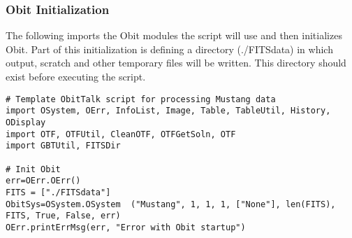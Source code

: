 \documentclass[11pt]{report}
\begin{document}
\subsubsection{Obit Initialization}
The following imports the Obit modules the script will use and then
initializes Obit.
Part of this initialization is defining a directory (./FITSdata) in
which output, scratch and other temporary files will be written.
This directory should exist before executing the script.
\begin{verbatim}
# Template ObitTalk script for processing Mustang data
import OSystem, OErr, InfoList, Image, Table, TableUtil, History, ODisplay
import OTF, OTFUtil, CleanOTF, OTFGetSoln, OTF
import GBTUtil, FITSDir

# Init Obit
err=OErr.OErr()
FITS = ["./FITSdata"]
ObitSys=OSystem.OSystem  ("Mustang", 1, 1, 1, ["None"], len(FITS), FITS, True, False, err)
OErr.printErrMsg(err, "Error with Obit startup")

\end{verbatim}
\end{document}
